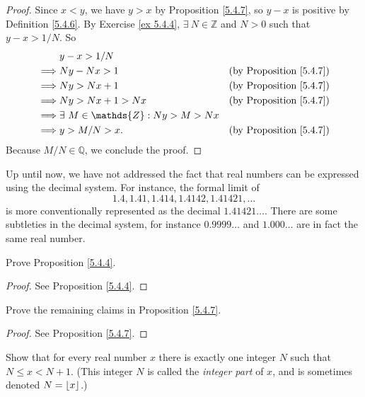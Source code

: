 \begin{proof}
Since \(x < y\), we have \(y > x\) by Proposition \ref{5.4.7}, so \(y - x\) is positive by Definition \ref{5.4.6}.
By Exercise \ref{ex 5.4.4}, \(\exists\ N \in \mathds{Z}\) and \(N > 0\) such that \(y - x > 1 / N\).
So
\begin{align*}
& y - x > 1 / N \\
\implies & Ny - Nx > 1 & \text{(by Proposition \ref{5.4.7})} \\
\implies & Ny > Nx + 1 & \text{(by Proposition \ref{5.4.7})} \\
\implies & Ny > Nx + 1 > Nx & \text{(by Proposition \ref{5.4.7})} \\
\implies & \exists\ M \in \mathds{Z} : Ny > M > Nx \\
\implies & y > M / N > x. & \text{(by Proposition \ref{5.4.7})} \\
\end{align*}
Because \(M / N \in \mathds{Q}\), we conclude the proof.
\end{proof}

\begin{remark}\label{5.4.15}
Up until now, we have not addressed the fact that real numbers can be expressed using the decimal system.
For instance, the formal limit of
\[
    1.4, 1.41, 1.414, 1.4142, 1.41421, \dots
\]
is more conventionally represented as the decimal \(1.41421\dots\).
There are some subtleties in the decimal system, for instance \(0.9999\dots\) and \(1.000\dots\) are in fact the same real number.
\end{remark}

\exercisesection

\begin{exercise}\label{ex 5.4.1}
Prove Proposition \ref{5.4.4}.
\end{exercise}

\begin{proof}
See Proposition \ref{5.4.4}.
\end{proof}

\begin{exercise}\label{ex 5.4.2}
Prove the remaining claims in Proposition \ref{5.4.7}.
\end{exercise}

\begin{proof}
See Proposition \ref{5.4.7}.
\end{proof}

\begin{exercise}\label{ex 5.4.3}
Show that for every real number \(x\) there is exactly one integer \(N\) such that \(N \leq x < N + 1\).
(This integer \(N\) is called the \emph{integer part} of \(x\), and is sometimes denoted \(N = \floor*{x}\).)
\end{exercise}

